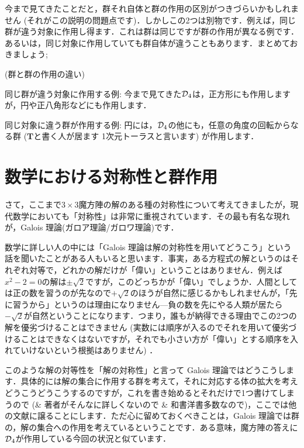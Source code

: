 \documentclass[11pt]{jsarticle}
\begin{document}
今まで見てきたことだと，群それ自体と群の作用の区別がつきづらいかもしれません (それがこの説明の問題点です)．しかしこの2つは別物です．例えば，同じ群が違う対象に作用し得ます．これは群は同じですが群の作用が異なる例です．あるいは，同じ対象に作用していても群自体が違うこともあります．まとめておきましょう;

\begin{eg}(群と群の作用の違い)
  
  同じ群が違う対象に作用する例: 今まで見てきた$\operatorname{\mathcal{D}}_4 $は，正方形にも作用しますが，円や正八角形などにも作用します．

  同じ対象に違う群が作用する例: 円には，$\operatorname{\mathcal{D}}_4$の他にも，任意の角度の回転からなる群 ($\mathbf{T} $と書く人が居ます\cite[p. 3]{katura} 1次元トーラスと言います) が作用します．
\end{eg}

\section{数学における対称性と群作用}
さて，ここまで$3\times 3$魔方陣の解のある種の対称性について考えてきましたが，現代数学においても「対称性」は非常に重視されています．その最も有名な現れが，Galois 理論(ガロア理論/ガロワ理論)です．


数学に詳しい人の中には「Galois 理論は解の対称性を用いてどうこう」という話を聞いたことがある人もいると思います．事実，ある方程式の解というのはそれぞれ対等で，どれかの解だけが「偉い」ということはありません．例えば$x^2-2=0$の解は$\pm \sqrt{2} $ですが，このどっちかが「偉い」でしょうか．人間としては正の数を習うのが先なので${+\sqrt{2}}$のほうが自然に感じるかもしれませんが，「先に習うから」というのは理由になりません---負の数を先にやる人類が居たら${-\sqrt{2}}$が自然ということになります．つまり，誰もが納得できる理由でこの2つの解を優劣づけることはできません (実数には順序が入るのでそれを用いて優劣づけることはできなくはないですが，それでも小さい方が「偉い」とする順序を入れていけないという根拠はありません) ．

このような解の対等性を「解の対称性」と言って Galois 理論ではどうこうします．具体的には解の集合に作用する群を考えて，それに対応する体の拡大を考えどうこうどうこうするのですが，これを書き始めるとそれだけで1つ書けてしまうので (\& 著者がそんなに詳しくないので \& 和書洋書多数なので)，ここでは他の文献に譲ることにします．ただ心に留めておくべきことは，Galois 理論では群の，解の集合への作用を考えているということです．ある意味，魔方陣の答えに$\operatorname{\mathcal{D}}_4$が作用している今回の状況と似ています．
\end{document}
